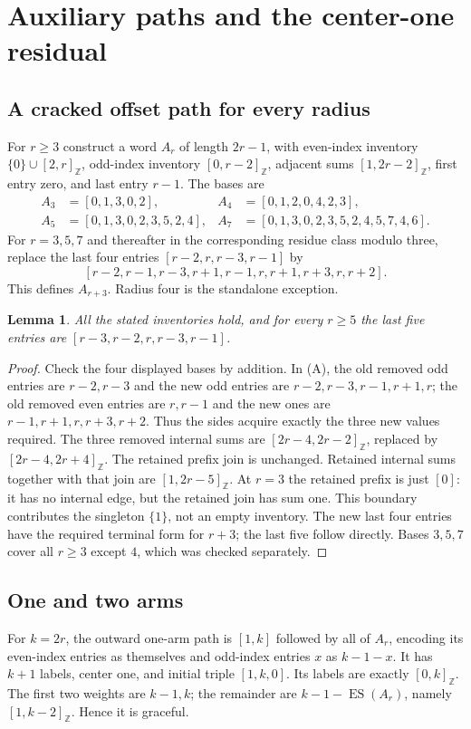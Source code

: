 \documentclass[11pt,a4paper]{article}
\newtheorem{lemma}[theorem]{Lemma}
\theoremstyle{definition}\newtheorem{definition}[theorem]{Definition}
\theoremstyle{remark}\newtheorem{remark}[theorem]{Remark}
\newcommand{\ints}[2]{[#1,#2]_{\mathbb Z}}
\newcommand{\ES}{\operatorname{ES}}
\begin{document}
\section{Auxiliary paths and the center-one residual}
\label{sec:one}
\subsection{A cracked offset path for every radius}
For $r\ge3$ construct a word $A_r$ of length $2r-1$, with even-index
inventory $\{0\}\cup\ints2r$, odd-index inventory $\ints0{r-2}$,
adjacent sums $\ints1{2r-2}$, first entry zero, and last entry $r-1$.
The bases are
\begin{align*}
 A_3&=[0,1,3,0,2],& A_4&=[0,1,2,0,4,2,3],\\
 A_5&=[0,1,3,0,2,3,5,2,4],&
 A_7&=[0,1,3,0,2,3,5,2,4,5,7,4,6].
\end{align*}
For $r=3,5,7$ and thereafter in the corresponding residue class modulo
three, replace the last four entries
$[r-2,r,r-3,r-1]$ by
\[
 [r-2,r-1,r-3,r+1,r-1,r,r+1,r+3,r,r+2].                 \tag{A}
\]
This defines $A_{r+3}$. Radius four is the standalone exception.

\begin{lemma}\label{lem:aux}
All the stated inventories hold, and for every $r\ge5$ the last five
entries are $[r-3,r-2,r,r-3,r-1]$.
\end{lemma}
\begin{proof}
Check the four displayed bases by addition. In (A), the old removed
odd entries are $r-2,r-3$ and the new odd entries are
$r-2,r-3,r-1,r+1,r$; the old removed even entries are $r,r-1$ and
the new ones are $r-1,r+1,r,r+3,r+2$. Thus the sides acquire exactly
the three new values required. The three removed internal sums are
$\ints{2r-4}{2r-2}$, replaced by $\ints{2r-4}{2r+4}$.
The retained prefix join is unchanged. Retained internal sums together
with that join are $\ints1{2r-5}$. At $r=3$ the retained prefix is
just $[0]$: it has no internal edge, but the retained join has sum one.
This boundary contributes the singleton $\{1\}$, not an empty inventory.
The new last four entries have the required terminal form for $r+3$;
the last five follow directly. Bases $3,5,7$ cover all $r\ge3$ except
$4$, which was checked separately.
\end{proof}

\subsection{One and two arms}
For $k=2r$, the outward one-arm path is $[1,k]$ followed by all of
$A_r$, encoding its even-index entries as themselves and odd-index
entries $x$ as $k-1-x$. It has $k+1$ labels, center one, and initial
triple $[1,k,0]$. Its labels are exactly $\ints0k$. The first two
weights are $k-1,k$; the remainder are $k-1-\ES(A_r)$,
namely $\ints1{k-2}$. Hence it is graceful.
\end{document}
